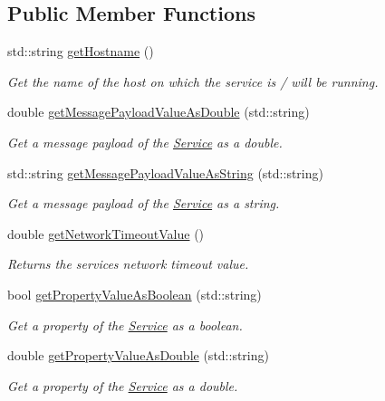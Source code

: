 \subsection*{Public Member Functions}
\begin{DoxyCompactItemize}
\item 
std\+::string \hyperlink{classwrench_1_1_service_a0b129fca804f421faba9445832a9cb48}{get\+Hostname} ()
\begin{DoxyCompactList}\small\item\em Get the name of the host on which the service is / will be running. \end{DoxyCompactList}\item 
double \hyperlink{classwrench_1_1_service_aff087b61b5b17230dc74f11666031f5b}{get\+Message\+Payload\+Value\+As\+Double} (std\+::string)
\begin{DoxyCompactList}\small\item\em Get a message payload of the \hyperlink{classwrench_1_1_service}{Service} as a double. \end{DoxyCompactList}\item 
std\+::string \hyperlink{classwrench_1_1_service_acdc27e21d4028a51285c036047d285a1}{get\+Message\+Payload\+Value\+As\+String} (std\+::string)
\begin{DoxyCompactList}\small\item\em Get a message payload of the \hyperlink{classwrench_1_1_service}{Service} as a string. \end{DoxyCompactList}\item 
double \hyperlink{classwrench_1_1_service_a113a90bcf686c79df677bb6dab61fc4e}{get\+Network\+Timeout\+Value} ()
\begin{DoxyCompactList}\small\item\em Returns the service\textquotesingle{}s network timeout value. \end{DoxyCompactList}\item 
bool \hyperlink{classwrench_1_1_service_aaacc5398b7fa16262348446006dba884}{get\+Property\+Value\+As\+Boolean} (std\+::string)
\begin{DoxyCompactList}\small\item\em Get a property of the \hyperlink{classwrench_1_1_service}{Service} as a boolean. \end{DoxyCompactList}\item 
double \hyperlink{classwrench_1_1_service_af7d4b5085ba46d9cead58f2d253e8339}{get\+Property\+Value\+As\+Double} (std\+::string)
\begin{DoxyCompactList}\small\item\em Get a property of the \hyperlink{classwrench_1_1_service}{Service} as a double. \end{DoxyCompactList}\item 

\end{DoxyCompactItemize}
